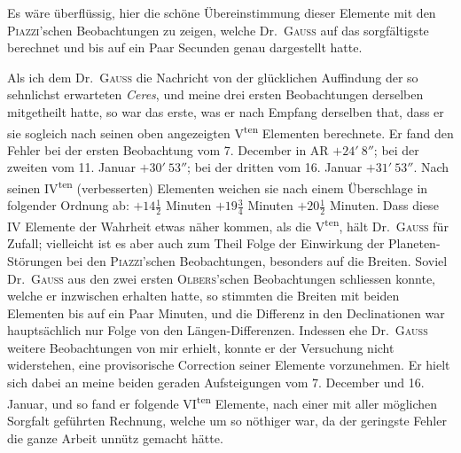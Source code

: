 Es wäre überflüssig, hier die schöne Übereinstimmung dieser Elemente mit den \textsc{Piazzi}'schen Beobachtungen zu zeigen, welche Dr.\ \textsc{Gauss} auf das sorgfältigste berechnet und bis auf ein Paar Secunden genau dargestellt hatte.

Als ich dem Dr.\ \textsc{Gauss} die Nachricht von der glücklichen Auffindung der so sehnlichst erwarteten \textit{Ceres}, und meine drei ersten Beobachtungen derselben mitgetheilt hatte, so war das erste, was er nach Empfang derselben that, dass er sie sogleich nach seinen oben angezeigten V\textsuperscript{ten} Elementen berechnete. Er fand den Fehler bei der ersten Beobachtung vom 7. December in AR $+24'\ 8''$; bei der zweiten vom 11. Januar $+30'\ 53''$; bei der dritten vom 16. Januar $+31'\ 53''$. Nach seinen IV\textsuperscript{ten} (verbesserten) Elementen weichen sie nach einem Überschlage in folgender Ordnung ab: $+14\frac12$ Minuten $+19\frac34$ Minuten $+20\frac12$ Minuten. Dass diese IV Elemente der Wahrheit etwas näher kommen, als die V\textsuperscript{ten}, hält Dr.\ \textsc{Gauss} für Zufall; vielleicht ist es aber auch zum Theil Folge der Einwirkung der Planeten-Störungen bei den \textsc{Piazzi}'schen Beobachtungen, besonders auf die Breiten. Soviel Dr.\ \textsc{Gauss} aus den zwei ersten \textsc{Olbers}'schen Beobachtungen schliessen konnte, welche er inzwischen erhalten hatte, so stimmten die Breiten mit beiden Elementen bis auf ein Paar Minuten, und die Differenz in den Declinationen war hauptsächlich nur Folge von den Längen-Differenzen. Indessen ehe Dr.\ \textsc{Gauss} weitere Beobachtungen von mir erhielt, konnte er der Versuchung nicht widerstehen, eine provisorische Correction seiner Elemente vorzunehmen. Er hielt sich dabei an meine beiden geraden Aufsteigungen vom 7. December und 16. Januar, und so fand er folgende VI\textsuperscript{ten} Elemente, nach einer mit aller möglichen Sorgfalt geführten Rechnung, welche um so nöthiger war, da der geringste Fehler die ganze Arbeit unnütz gemacht hätte.
